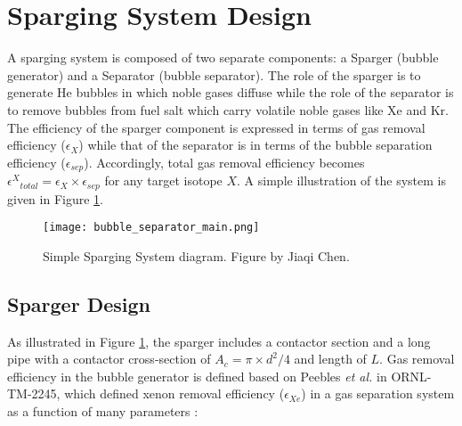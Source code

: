 \FloatBarrier

\section{Sparging System Design}

    A sparging system is composed of two separate components: a Sparger (bubble 
    generator) and a Separator (bubble separator). The role of the sparger is to 
    generate He bubbles in which noble gases diffuse while the role of the 
    separator is to remove bubbles from fuel salt which carry volatile noble 
    gases like Xe and Kr. The efficiency of the sparger component is expressed 
    in terms of gas removal efficiency ($\epsilon_{X}$) while that of the 
    separator is in terms of the bubble separation efficiency 
    ($\epsilon_{sep}$). Accordingly, total gas removal efficiency becomes 
    ${\epsilon^{X}}_{total} = \epsilon_{X} \times \epsilon_{sep}$ for any 
    target isotope $X$. A simple illustration of the system is given in Figure 
    \ref{fig:sparging}.

    \begin{figure}[htbp!]
        \begin{center}
            \texttt{[image: bubble\_separator\_main.png]}
        \end{center}
            \caption{Simple Sparging System diagram. Figure by Jiaqi Chen.}
        \label{fig:sparging}
    \end{figure}

\subsection{Sparger Design}

 As illustrated in Figure \ref{fig:sparging}, the sparger includes a contactor 
 section and a long pipe with a contactor cross-section of $A_c = \pi\times 
 d^2/4$ and length of $L$. Gas removal efficiency in the bubble generator is 
 defined based on Peebles \emph{et al.} in 
 ORNL-TM-2245, which defined xenon removal efficiency
($\epsilon_{Xe}$) in a gas separation system as a function of many parameters \cite{peebles_removal_1968}:

